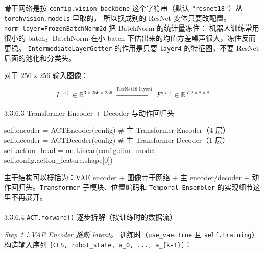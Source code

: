 \documentclass[
  chinese,
]{ctexart}
\makeatletter
\let\oldparagraph\paragraph
\renewcommand{\paragraph}{
    \@ifstar
      \xxxParagraphStar
      \xxxParagraphNoStar
  }
\newcommand{\xxxParagraphStar}[1]{\oldparagraph*{#1}\mbox{}}
\newcommand{\xxxParagraphNoStar}[1]{\oldparagraph{#1}\mbox{}}
\newenvironment{Shaded}{\begin{snugshade}}{\end{snugshade}}
\newcommand{\CommentTok}[1]{\textcolor[rgb]{0.37,0.37,0.37}{#1}}
\newcommand{\DecValTok}[1]{\textcolor[rgb]{0.68,0.00,0.00}{#1}}
\newcommand{\NormalTok}[1]{\textcolor[rgb]{0.00,0.23,0.31}{#1}}
\newcommand{\OperatorTok}[1]{\textcolor[rgb]{0.37,0.37,0.37}{#1}}
\newcommand{\VariableTok}[1]{\textcolor[rgb]{0.07,0.07,0.07}{#1}}
\makeatother
\begin{document}
骨干网络是按 \texttt{config.vision\_backbone} 这个字符串（默认
\texttt{"resnet18"}）从 \texttt{torchvision.models} 里取的，
所以换成别的 ResNet
变体只要改配置。\texttt{norm\_layer=FrozenBatchNorm2d} 把 BatchNorm
的统计量冻住： 机器人训练常用很小的 batch，BatchNorm 在小 batch
下估出来的均值方差噪声很大，冻住反而更稳。
\texttt{IntermediateLayerGetter} 的作用是只要 \texttt{layer4}
的特征图，不要 ResNet 后面的池化和分类头。

对于 \(256 \times 256\) 输入图像：

\[
I^{(c)} \in \mathbb{R}^{3 \times 256 \times 256} \;\xrightarrow{\text{ResNet18 layer4}}\; F^{(c)} \in \mathbb{R}^{512 \times 8 \times 8}
\]

\paragraph{3.3.6.3 Transformer Encoder + Decoder
与动作回归头}\label{transformer-encoder-decoder-ux4e0eux52a8ux4f5cux56deux5f52ux5934}

\begin{Shaded}
\begin{Highlighting}[]
\VariableTok{self}\NormalTok{.encoder }\OperatorTok{=}\NormalTok{ ACTEncoder(config)   }\CommentTok{\# 主 Transformer Encoder（4 层）}
\VariableTok{self}\NormalTok{.decoder }\OperatorTok{=}\NormalTok{ ACTDecoder(config)   }\CommentTok{\# 主 Transformer Decoder（1 层）}
\VariableTok{self}\NormalTok{.action\_head }\OperatorTok{=}\NormalTok{ nn.Linear(config.dim\_model, }\VariableTok{self}\NormalTok{.config.action\_feature.shape[}\DecValTok{0}\NormalTok{])}
\end{Highlighting}
\end{Shaded}

主干结构可以概括为：VAE encoder + 图像骨干网络 + 主 encoder/decoder +
动作回归头。\texttt{Transformer} 子模块、位置编码和
\texttt{Temporal\ Ensembler} 的实现细节这里不再展开。

\paragraph{\texorpdfstring{3.3.6.4 \texttt{ACT.forward()}
逐步拆解（按训练时的数据流）}{3.3.6.4 ACT.forward() 逐步拆解（按训练时的数据流）}}\label{act.forward-ux9010ux6b65ux62c6ux89e3ux6309ux8badux7ec3ux65f6ux7684ux6570ux636eux6d41}

\emph{Step 1：VAE Encoder 推断 latent。} 训练时（\texttt{use\_vae=True}
且 \texttt{self.training}）构造输入序列
\texttt{{[}CLS,\ robot\_state,\ a\_0,\ ...,\ a\_\{k-1\}{]}}：
\end{document}
